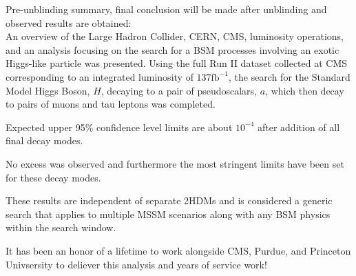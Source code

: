 Pre-unblinding summary, final conclusion will be made after unblinding and observed results are obtained: \\



An overview of the Large Hadron Collider, CERN, CMS, luminosity operations, and an analysis focusing on the search for a BSM processes involving an exotic Higgs-like particle was presented.
Using the full Run II dataset collected at CMS corresponding to an integrated luminosity of $\text{137}\text{fb}^{-1}$, the search for the Standard Model Higgs Boson, $H$, decaying to a pair of pseudoscalars, $a$, which then decay to pairs of muons and tau leptons was completed. 

Expected upper 95\% confidence level limits are about $10^{-4}$ after addition of all final decay modes. 


No excess was observed and furthermore the most stringent limits have been set for these decay modes. 


These results are independent of separate 2HDMs and is considered a generic search that applies to multiple MSSM scenarios along with any BSM physics within the search window. 

It has been an honor of a lifetime to work alongside CMS, Purdue, and Princeton Univsersity to deliever this analysis and years of service work! 
